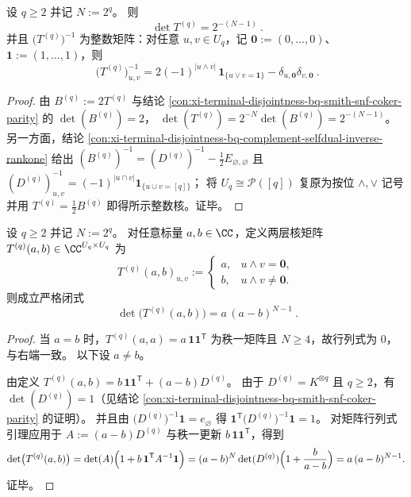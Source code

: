 \begin{corollary}[全矩阵行列式的塌缩与整数逆核]\label{cor:xi-terminal-replica-softcore-Tq-det-and-integer-inverse-kernel}
设 \(q\ge 2\) 并记 \(N:=2^q\)。
则
\[
\boxed{\ \det T^{(q)}=2^{-(N-1)}\ }.
\]
并且 \(\bigl(T^{(q)}\bigr)^{-1}\) 为整数矩阵：对任意 \(u,v\in U_q\)，记 \(\mathbf{0}:=(0,\dots,0)\)、\(\mathbf{1}:=(1,\dots,1)\)，则
\[
\boxed{\ \bigl(T^{(q)}\bigr)^{-1}_{u,v}
=2(-1)^{|u\wedge v|}\,\mathbf{1}_{\{u\vee v=\mathbf{1}\}}
-\delta_{u,\mathbf{0}}\delta_{v,\mathbf{0}}\ } .
\]
\end{corollary}
\begin{proof}
由 \(B^{(q)}:=2T^{(q)}\) 与结论 \ref{con:xi-terminal-disjointness-bq-smith-snf-coker-parity} 的 \(\det(B^{(q)})=2\)，
\(
\det(T^{(q)})=2^{-N}\det(B^{(q)})=2^{-(N-1)}
\)。
另一方面，结论 \ref{con:xi-terminal-disjointness-bq-complement-selfdual-inverse-rankone} 给出
\(
(B^{(q)})^{-1}=(D^{(q)})^{-1}-\frac12E_{\varnothing,\varnothing}
\)
且 \((D^{(q)})^{-1}_{u,v}=(-1)^{|u\cap v|}\mathbf{1}_{\{u\cup v=[q]\}}\)；
将 \(U_q\cong\mathcal P([q])\) 复原为按位 \(\wedge,\vee\) 记号并用 \(T^{(q)}=\frac12B^{(q)}\) 即得所示整数核。证毕。
\end{proof}

\begin{corollary}\label{cor:xi-terminal-replica-softcore-twolevel-kernel-det}
设 \(q\ge 2\) 并记 \(N:=2^q\)。
对任意标量 \(a,b\in\CC\)，定义两层核矩阵 \(T^{(q)}(a,b)\in\CC^{U_q\times U_q}\) 为
\[
T^{(q)}(a,b)_{u,v}:=
\begin{cases}
a,&u\wedge v=\mathbf{0},\\[2pt]
b,&u\wedge v\neq \mathbf{0}.
\end{cases}
\]
则成立严格闭式
\[
\boxed{\ \det\bigl(T^{(q)}(a,b)\bigr)=a\,(a-b)^{N-1}\ }.
\]
\end{corollary}
\begin{proof}
当 \(a=b\) 时，\(T^{(q)}(a,a)=a\,\mathbf{1}\mathbf{1}^{\mathsf T}\) 为秩一矩阵且 \(N\ge 4\)，故行列式为 \(0\)，与右端一致。
以下设 \(a\neq b\)。
\par
由定义
\(
T^{(q)}(a,b)=b\,\mathbf{1}\mathbf{1}^{\mathsf T}+(a-b)D^{(q)}
\)。
由于 \(D^{(q)}=K^{\otimes q}\) 且 \(q\ge 2\)，有 \(\det(D^{(q)})=1\)（见结论 \ref{con:xi-terminal-disjointness-bq-smith-snf-coker-parity} 的证明）。
并且由 \(\bigl(D^{(q)}\bigr)^{-1}\mathbf{1}=e_{\varnothing}\) 得
\(\mathbf{1}^{\mathsf T}\bigl(D^{(q)}\bigr)^{-1}\mathbf{1}=1\)。
对矩阵行列式引理应用于
\(
A:=(a-b)D^{(q)}
\)
与秩一更新 \(b\,\mathbf{1}\mathbf{1}^{\mathsf T}\)，得到
\[
\det\bigl(T^{(q)}(a,b)\bigr)
=\det(A)\Bigl(1+b\,\mathbf{1}^{\mathsf T}A^{-1}\mathbf{1}\Bigr)
=(a-b)^{N}\det(D^{(q)})\Bigl(1+\frac{b}{a-b}\Bigr)
=a\,(a-b)^{N-1}.
\]
证毕。
\end{proof}

